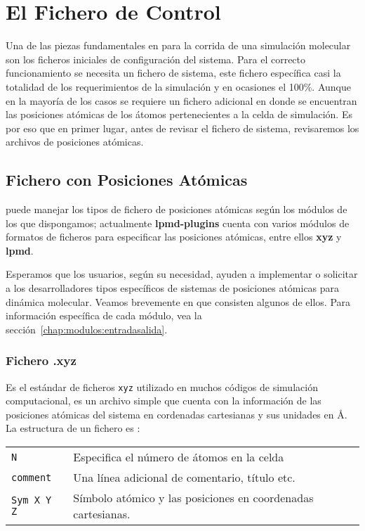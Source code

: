 \chapter{El Fichero de Control}
\label{chap:input}

Una de las piezas fundamentales en \lpmd para la corrida de una simulaci\'on molecular son los ficheros iniciales de configuraci\'on del sistema. Para el correcto funcionamiento se necesita un fichero de sistema, este fichero espec\'ifica casi la totalidad de los requerimientos de la simulaci\'on y en ocasiones el 100\%. Aunque en la mayor\'ia de los casos se requiere un fichero adicional en donde se encuentran las posiciones at\'omicas de los \'atomos pertenecientes a la celda de simulaci\'on. Es por eso que en primer lugar, antes de revisar el fichero de sistema, revisaremos los archivos de posiciones at\'omicas.

\section{Fichero con Posiciones At\'omicas}

\lpmd puede manejar los tipos de fichero de posiciones at\'omicas seg\'un los m\'odulos de los que dispongamos; actualmente \textbf{lpmd-plugins} cuenta con varios m\'odulos de formatos de ficheros para especificar las posiciones at\'omicas, entre ellos \textbf{xyz} y \textbf{lpmd}.

Esperamos que los usuarios, seg\'un su necesidad, ayuden a implementar o solicitar a los desarrolladores tipos espec\'ificos de sistemas de posiciones at\'omicas para din\'amica molecular. Veamos brevemente en que consisten algunos de ellos. Para informaci\'on espec\'ifica de cada m\'odulo, vea la secci\'on~\ref{chap:modulos:entradasalida}.

\subsection{Fichero .xyz}

Es el est\'andar de ficheros \verb|xyz| utilizado en muchos c\'odigos de simulaci\'on computacional, es un archivo simple que cuenta con la informaci\'on de las posiciones at\'omicas del sistema en cordenadas cartesianas y sus unidades en \AA. La estructura de un fichero es :
\begin{center}
\begin{tabular}{l|l}
 \verb|N| & Especifica el n\'umero de \'atomos en la celda \\
 \verb|comment| & Una l\'inea adicional de comentario, t\'itulo etc. \\
 \verb|Sym X Y Z| & S\'imbolo at\'omico y las posiciones en coordenadas cartesianas. \\
\end{tabular}
\end{center}


